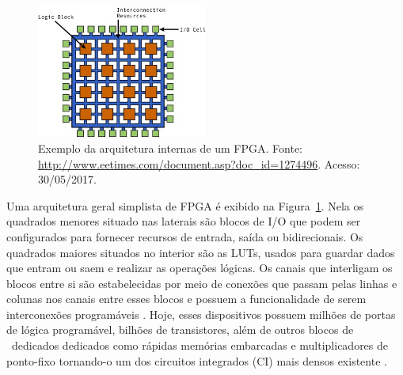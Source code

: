    \begin{figure} \centering
      \vspace{-10pt}
      \includegraphics[width=0.5\textwidth]{img/rt-arch_fpga.jpg}
      \vspace{-15pt}
      \caption{Exemplo da arquitetura internas de um FPGA. Fonte: \url{http://www.eetimes.com/document.asp?doc_id=1274496}. Acesso: 30/05/2017.}
      \label{fig:rb-arch_fpga}
   \end{figure}

   Uma arquitetura geral simplista de FPGA é exibido na Figura~\ref{fig:rb-arch_fpga}. Nela os quadrados menores situado nas laterais são blocos de I/O que podem ser configurados para fornecer recursos de entrada, saída ou bidirecionais.
   Os quadrados maiores situados no interior são as LUTs, usados para guardar dados que entram ou saem e realizar as operações lógicas.
   Os canais que interligam os blocos entre si são estabelecidas por meio de conexões que passam pelas linhas e colunas nos canais entre esses blocos e possuem a funcionalidade de serem interconexões programáveis \citep{tocci2003sistemas}.
   Hoje, esses dispositivos possuem milhões de portas de lógica programável, bilhões de transistores, além de outros blocos de \hardware\ dedicados dedicados como rápidas memórias embarcadas e multiplicadores de ponto-fixo tornando-o um dos circuitos integrados (CI) mais densos existente \citep{Choi2016}.


